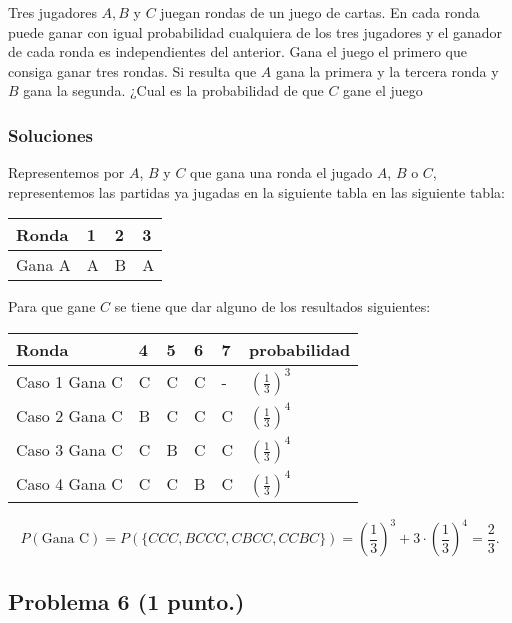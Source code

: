 \documentclass[
]{article}
\begin{document}
Tres jugadores \(A,B\) y \(C\) juegan rondas de un juego de cartas. En
cada ronda puede ganar con igual probabilidad cualquiera de los tres
jugadores y el ganador de cada ronda es independientes del anterior.
Gana el juego el primero que consiga ganar tres rondas. Si resulta que
\(A\) gana la primera y la tercera ronda y \(B\) gana la segunda. ¿Cual
es la probabilidad de que \(C\) gane el juego

\hypertarget{soluciones}{%
\subsubsection{Soluciones}\label{soluciones}}

Representemos por \(A\), \(B\) y \(C\) que gana una ronda el jugado
\(A\), \(B\) o \(C\), representemos las partidas ya jugadas en la
siguiente tabla en las siguiente tabla:

\begin{tabular}{|l||l|l|l|}
\hline
Ronda & 1 & 2 & 3\\\hline\hline
Gana A & A & B & A\\ \hline
\end{tabular}

Para que gane \(C\) se tiene que dar alguno de los resultados
siguientes:

\begin{table*}
\centering
\begin{tabular}{|l||l|l|l|l|l|}
\hline
Ronda & 4 & 5 & 6 & 7 & probabilidad \\\hline\hline
Caso 1 Gana C & C & C & C & -  & $\left(\frac{1}{3}\right)^3$\\ \hline
Caso 2 Gana C & B & C & C & C  & $\left(\frac{1}{3}\right)^4$\\ \hline
Caso 3 Gana C & C & B & C & C  & $\left(\frac{1}{3}\right)^4$\\ \hline
Caso 4 Gana C & C & C & B & C  & $\left(\frac{1}{3}\right)^4$\\ \hline
\end{tabular}
\end{table*}

\[P(\mbox{Gana C})= P(\{CCC,BCCC,CBCC,CCBC\})=
\left(\frac{1}{3}\right)^3 + 3\cdot \left(\frac{1}{3}\right)^4=\frac{2}{3}.\]

\hypertarget{problema-6}{%
\subsection{\texorpdfstring{Problema 6
(\textbf{1 punto.})}{Problema 6 ()}}\label{problema-6}}
\end{document}
